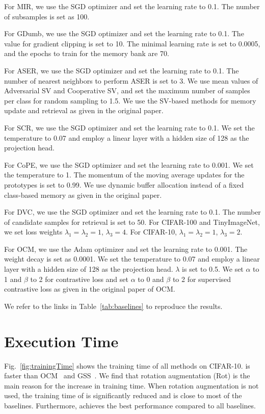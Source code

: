 For MIR, we use the SGD optimizer and set the learning rate to 0.1. The number of subsamples is set as 100.

For GDumb, we use the SGD optimizer and set the learning rate to 0.1. The value for gradient clipping is set to 10. The minimal learning rate is set to 0.0005, and the epochs to train for the memory bank are 70.

For ASER, we use the SGD optimizer and set the learning rate to 0.1. The number of nearest neighbors to perform ASER is set to 3. We use mean values of Adversarial SV and Cooperative SV, and set the maximum number of samples per class for random sampling to 1.5. We use the SV-based methods for memory update and retrieval as given in the original paper.

For SCR, we use the SGD optimizer and set the learning rate to 0.1. We set the temperature to 0.07 and employ a linear layer with a hidden size of 128 as the projection head.

For CoPE, we use the SGD optimizer and set the learning rate to 0.001. We set the temperature to 1. The momentum of the moving average updates for the prototypes is set to 0.99. We use dynamic buffer allocation instead of a fixed class-based memory as given in the original paper.

For DVC, we use the SGD optimizer and set the learning rate to 0.1. The number of candidate samples for retrieval is set to 50. For CIFAR-100 and TinyImageNet, we set loss weights $\lambda_1 = \lambda_2 = 1$, $\lambda_3 = 4$. For CIFAR-10, $\lambda_1 = \lambda_2 = 1$, $\lambda_3 = 2$.

For OCM, we use the Adam optimizer and set the learning rate to 0.001. The weight decay is set as 0.0001. We set the temperature to 0.07 and employ a linear layer with a hidden size of 128 as the projection head. $\lambda$ is set to 0.5. We set $\alpha$ to 1 and $\beta$ to 2 for contrastive loss and set $\alpha$ to 0 and $\beta$ to 2 for supervised contrastive loss as given in the original paper of OCM.

We refer to the links in Table~\ref{tab:baselines} to reproduce the results.


\section{Execution Time}

Fig.~\ref{fig:trainingTime} shows the training time of all methods on CIFAR-10. \frameworkName is faster than OCM~\cite{OCM} and GSS~\cite{GSS}. We find that rotation augmentation (Rot) is the main reason for the increase in training time. 
When rotation augmentation is not used, the training time of \frameworkName is significantly reduced and is close to most of the baselines.
Furthermore, \frameworkName achieves the best performance compared to all baselines.
